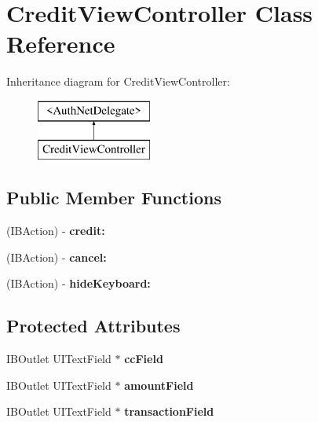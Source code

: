 \hypertarget{interface_credit_view_controller}{
\section{CreditViewController Class Reference}
\label{interface_credit_view_controller}
}
Inheritance diagram for CreditViewController:\begin{figure}[H]
\begin{center}
\leavevmode
\includegraphics[height=2.000000cm]{interface_credit_view_controller}
\end{center}
\end{figure}
\subsection*{Public Member Functions}
\begin{DoxyCompactItemize}
\item 
\hypertarget{interface_credit_view_controller_ad8db32da13daeaeebfce9f0f90a5558e}{
(IBAction) -\/ {\bfseries credit:}}
\label{interface_credit_view_controller_ad8db32da13daeaeebfce9f0f90a5558e}

\item 
\hypertarget{interface_credit_view_controller_ad1c5a92da5385516a6e327ddbbd5131c}{
(IBAction) -\/ {\bfseries cancel:}}
\label{interface_credit_view_controller_ad1c5a92da5385516a6e327ddbbd5131c}

\item 
\hypertarget{interface_credit_view_controller_a818e3bda218a6d318cafadde1e02d707}{
(IBAction) -\/ {\bfseries hideKeyboard:}}
\label{interface_credit_view_controller_a818e3bda218a6d318cafadde1e02d707}

\end{DoxyCompactItemize}
\subsection*{Protected Attributes}
\begin{DoxyCompactItemize}
\item 
\hypertarget{interface_credit_view_controller_a246fd17c0dcb5b443f2ca9634cd569fb}{
IBOutlet UITextField $\ast$ {\bfseries ccField}}
\label{interface_credit_view_controller_a246fd17c0dcb5b443f2ca9634cd569fb}

\item 
\hypertarget{interface_credit_view_controller_a58dad2cb6104ac0b9a70b019479af701}{
IBOutlet UITextField $\ast$ {\bfseries amountField}}
\label{interface_credit_view_controller_a58dad2cb6104ac0b9a70b019479af701}

\item 
\hypertarget{interface_credit_view_controller_af9759cc92e6b983690ca0e7577c0e824}{
IBOutlet UITextField $\ast$ {\bfseries transactionField}}
\label{interface_credit_view_controller_af9759cc92e6b983690ca0e7577c0e824}

\end{DoxyCompactItemize}
